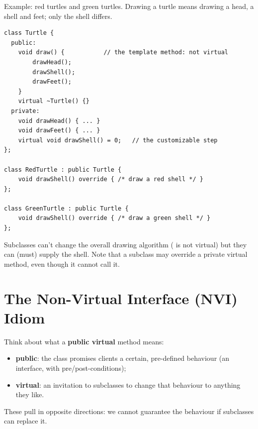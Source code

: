 Example: red turtles and green turtles. Drawing a turtle means drawing a head,
a shell and feet; only the shell differs.
\begin{lstlisting}[style=cpp]
class Turtle {
  public:
    void draw() {           // the template method: not virtual
        drawHead();
        drawShell();
        drawFeet();
    }
    virtual ~Turtle() {}
  private:
    void drawHead() { ... }
    void drawFeet() { ... }
    virtual void drawShell() = 0;   // the customizable step
};

class RedTurtle : public Turtle {
    void drawShell() override { /* draw a red shell */ }
};

class GreenTurtle : public Turtle {
    void drawShell() override { /* draw a green shell */ }
};
\end{lstlisting}
Subclasses can't change the overall drawing algorithm ( is not
virtual) but they can (must) supply the shell. Note that a subclass may override
a private virtual method, even though it cannot call it.
\begin{center}
\end{center}

\section{The Non-Virtual Interface (NVI) Idiom}
Think about what a \textbf{public virtual} method means:
\begin{itemize}
  \item \textbf{public}: the class promises clients a certain, pre-defined
        behaviour (an interface, with pre/post-conditions);
  \item \textbf{virtual}: an invitation to subclasses to change that behaviour
        to anything they like.
\end{itemize}
These pull in opposite directions: we cannot guarantee the behaviour if
subclasses can replace it.

